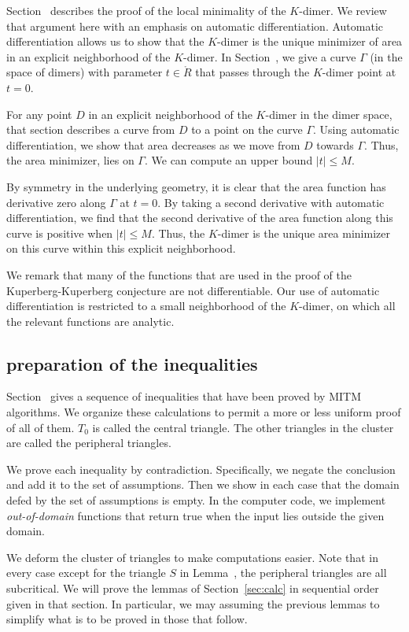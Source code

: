Section~ describes the proof of the local minimality of the $K$-dimer.  We review that
argument here with an emphasis on automatic differentiation.
Automatic differentiation allows us to show that the $K$-dimer  is the unique minimizer of area
in an explicit neighborhood of the $K$-dimer.  In Section~, we give a curve $\Gamma$ 
(in the space of dimers) with parameter $t\in\ring{R}$
that passes through the $K$-dimer point at $t=0$.  

For any point $D$ in an explicit neighborhood of the $K$-dimer in the dimer space, that section describes a curve from $D$ to a point
on the curve $\Gamma$.  
Using automatic differentiation, we show that area decreases as we move from $D$ towards $\Gamma$.
Thus, the area minimizer, lies on $\Gamma$.  We can compute an upper bound $|t|\le M$.

By symmetry in the underlying geometry, 
it is clear that the area function has derivative zero along $\Gamma$ at
$t=0$. By taking a second derivative with automatic differentiation, we find that the second derivative of
the area function along this curve is positive
when  $|t|\le M$.   Thus, the $K$-dimer is the unique area minimizer on this curve within this explicit neighborhood.

We remark that many of the functions that are used in the proof of the Kuperberg-Kuperberg conjecture are not
differentiable.  Our use of automatic differentiation is restricted to a small neighborhood of the $K$-dimer, on
which all the relevant functions are analytic.

\subsection{preparation of the inequalities}

Section~ gives a sequence of inequalities that have been proved by MITM algorithms.
We organize these calculations to permit a more or less uniform proof of all of them.
$T_0$ is called the central triangle.  The other triangles in the cluster are called the peripheral triangles.

We prove each inequality by contradiction. Specifically, we negate the conclusion and add it to the
set of assumptions.  Then we show in each case that the domain defed by the set of assumptions is
empty. In the computer code, we implement {\it out-of-domain} functions that return true when the input
lies outside the given domain.

We deform the cluster of triangles to make computations easier.  Note that in every case except for the
triangle $S$ in Lemma~, the peripheral triangles are all subcritical.  We will prove
the lemmas of Section~\ref{sec:calc} in sequential order given in that section.  
In particular, we may  assuming the previous
lemmas to simplify what is to be proved in those that follow.

